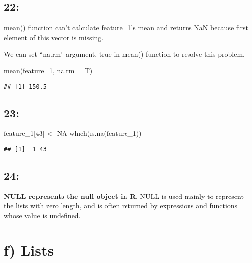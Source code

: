 \documentclass[
]{article}
\newenvironment{Shaded}{\begin{snugshade}}{\end{snugshade}}
\newcommand{\AttributeTok}[1]{\textcolor[rgb]{0.77,0.63,0.00}{#1}}
\newcommand{\ConstantTok}[1]{\textcolor[rgb]{0.00,0.00,0.00}{#1}}
\newcommand{\DecValTok}[1]{\textcolor[rgb]{0.00,0.00,0.81}{#1}}
\newcommand{\FunctionTok}[1]{\textcolor[rgb]{0.00,0.00,0.00}{#1}}
\newcommand{\NormalTok}[1]{#1}
\newcommand{\OtherTok}[1]{\textcolor[rgb]{0.56,0.35,0.01}{#1}}
\begin{document}
\hypertarget{section-21}{%
\subsection{22:}\label{section-21}}

mean() function can't calculate feature\_1's mean and returns NaN
because first element of this vector is missing.

We can set ``na.rm'' argument, true in mean() function to resolve this
problem.

\begin{Shaded}
\begin{Highlighting}[]
\FunctionTok{mean}\NormalTok{(feature\_1, }\AttributeTok{na.rm =}\NormalTok{ T)}
\end{Highlighting}
\end{Shaded}

\begin{verbatim}
## [1] 150.5
\end{verbatim}

\hypertarget{section-22}{%
\subsection{23:}\label{section-22}}

\begin{Shaded}
\begin{Highlighting}[]
\NormalTok{feature\_1[}\DecValTok{43}\NormalTok{] }\OtherTok{\textless{}{-}} \ConstantTok{NA}
\FunctionTok{which}\NormalTok{(}\FunctionTok{is.na}\NormalTok{(feature\_1))}
\end{Highlighting}
\end{Shaded}

\begin{verbatim}
## [1]  1 43
\end{verbatim}

\hypertarget{section-23}{%
\subsection{24:}\label{section-23}}

\textbf{NULL represents the null object in R}. NULL is used mainly to
represent the lists with zero length, and is often returned by
expressions and functions whose value is undefined.

\hypertarget{f-lists}{%
\section{f) Lists}\label{f-lists}}
\end{document}
